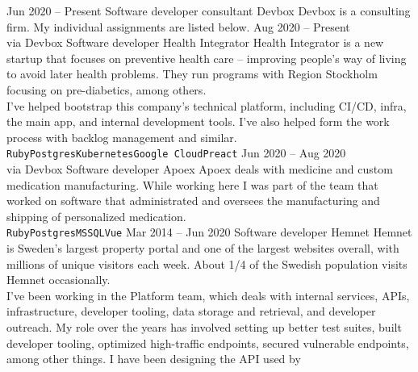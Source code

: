 \documentclass[9pt]{developercv} %
\begin{document}

\pagebreak
{}

\begin{entrylist}
  \entry
    {Jun 2020 -- Present}
    {Software developer consultant}
    {Devbox}
    {Devbox is a consulting firm. My individual assignments are listed below.}
  \entry
    {Aug 2020 -- Present\\\footnotesize{via Devbox}}
    {Software developer}
    {Health Integrator}
    {Health Integrator is a new startup that focuses on preventive health care
    -- improving people's way of living to avoid later health problems. They
    run programs with Region Stockholm focusing on pre-diabetics, among
    others.\\ I've helped bootstrap this company's technical platform,
    including CI/CD, infra, the main app, and internal development tools. I've
    also helped form the work process with backlog management and similar.\\
      \texttt{Ruby}\slashsep\texttt{Postgres}\slashsep\texttt{Kubernetes}\slashsep\texttt{Google
      Cloud}\slashsep\texttt{Preact}}
  \entry
    {Jun 2020 -- Aug 2020\\\footnotesize{via Devbox}}
    {Software developer}
    {Apoex}
    {Apoex deals with medicine and custom medication manufacturing. While
      working here I was part of the team that worked on software that
      administrated and oversees the manufacturing and shipping of personalized
      medication.\\
      \texttt{Ruby}\slashsep\texttt{Postgres}\slashsep\texttt{MSSQL}\slashsep\texttt{Vue}}
  \entry
    {Mar 2014 -- Jun 2020}
    {Software developer}
    {Hemnet}
    {Hemnet is Sweden's largest property portal and one of the largest websites
      overall, with millions of unique visitors each week. About 1/4 of the
      Swedish population visits Hemnet occasionally.\\ I've been working in the
      Platform team, which deals with internal services, APIs, infrastructure,
      developer tooling, data storage and retrieval, and developer outreach. My
      role over the years has involved setting up better test suites, built
      developer tooling, optimized high-traffic endpoints, secured vulnerable
      endpoints, among other things. I have been designing the API used by
}
\end{entrylist}
\end{document}

